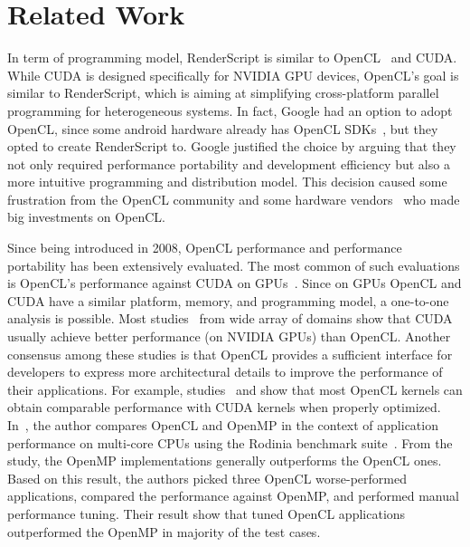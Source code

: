 \section{Related Work}

In term of programming model, RenderScript is similar to OpenCL~\cite{OpenCL}
and CUDA. While CUDA is designed specifically for NVIDIA GPU devices, OpenCL's
goal is similar to RenderScript, which is aiming at simplifying cross-platform
parallel programming for heterogeneous systems.  In fact, Google had an option
to adopt OpenCL, since some android hardware already has OpenCL
SDKs~\cite{OpenCL:Android}, but they opted to create RenderScript to.  Google
justified the choice by arguing that they not only required performance
portability and development efficiency but also a more intuitive programming and
distribution model.  This decision caused some frustration from the OpenCL
community \cite{androidblockopenCL} and some hardware
vendors~\cite{googlelockin} who made big investments on OpenCL.

Since being introduced in 2008, OpenCL performance and performance portability
has been extensively evaluated.  The most common of such evaluations is OpenCL's
performance against CUDA on GPUs~\cite{fang2011comprehensive,
weber2011comparing, van2011correlating, vassilev2010comparison,
amorim2009comparing, karimi2010performance, komatsu2010evaluating}.  Since on
GPUs OpenCL and CUDA have a similar platform, memory, and programming model, a
one-to-one analysis is possible.  Most studies~\cite{weber2011comparing,
van2011correlating, vassilev2010comparison, amorim2009comparing}  from wide
array of domains show that CUDA usually achieve better performance (on NVIDIA
GPUs) than OpenCL.  Another consensus among these studies is that OpenCL
provides a sufficient interface for developers to express more architectural
details to improve the performance of their applications.  For example,
studies~\cite{komatsu2010evaluating} and \cite{fang2011comprehensive} show that
most OpenCL kernels can obtain comparable performance with CUDA kernels when
properly optimized.  In~\cite{shen2012performance}, the author compares OpenCL
and OpenMP in the context of application performance on multi-core CPUs using
the Rodinia benchmark suite~\cite{che2009rodinia}.  From the study, the OpenMP
implementations generally outperforms the OpenCL ones.  Based on this result,
the authors picked three OpenCL worse-performed applications, compared the
performance against OpenMP, and performed manual performance tuning.  Their
result show that tuned OpenCL applications outperformed the OpenMP in majority
of the test cases.

